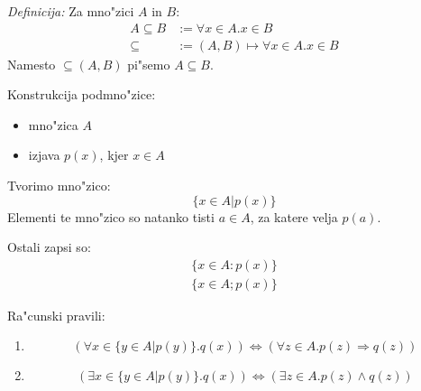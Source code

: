 \emph{Definicija:} Za mno"zici $A$ in $B$:
\begin{align*}
A \subseteq B &:= \forall x \in A . x \in B\\
\subseteq &:= (A, B) \mapsto \forall x \in A . x \in B
\end{align*}
Namesto $\subseteq(A, B)$ pi"semo $A \subseteq B$.

Konstrukcija podmno"zice:
\begin{itemize}
	\item mno"zica $A$
	\item izjava $p(x)$, kjer $x \in A$
\end{itemize}
Tvorimo mno"zico:
\begin{equation*}
\{x \in A | p(x)\}
\end{equation*}
Elementi te mno"zico so natanko tisti $a \in A$, za katere velja $p(a)$.

Ostali zapsi so:
\begin{gather*}
	\{x \in A: p(x)\}\\
	\{x \in A ; p(x)\}
\end{gather*}

Ra"cunski pravili:
\begin{enumerate}[1)]
	\item
	\begin{equation*}
	(\forall x \in \{y \in A | p(y)\} . q(x)) \iff (\forall z \in A. p(z) \Rightarrow q(z))
	\end{equation*}
	
	\item 
	\begin{equation*}
	(\exists x \in \{y \in A | p(y)\} . q(x)) \iff (\exists z \in A. p(z) \land q(z))
	\end{equation*}
\end{enumerate}
